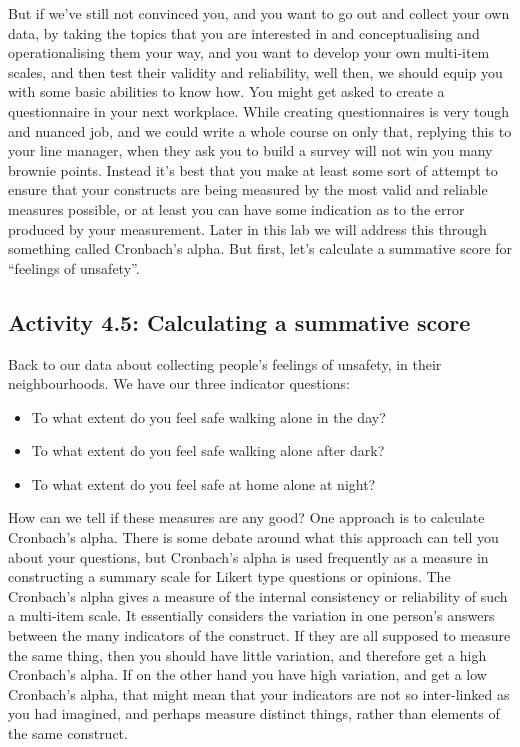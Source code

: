 \documentclass[
]{book}
\providecommand{\tightlist}{%
  \setlength{\itemsep}{0pt}\setlength{\parskip}{0pt}}
\begin{document}
But if we've still not convinced you, and you want to go out and collect your own data, by taking the topics that you are interested in and conceptualising and operationalising them your way, and you want to develop your own multi-item scales, and then test their validity and reliability, well then, we should equip you with some basic abilities to know how. You might get asked to create a questionnaire in your next workplace. While creating questionnaires is very tough and nuanced job, and we could write a whole course on only that, replying this to your line manager, when they ask you to build a survey will not win you many brownie points. Instead it's best that you make at least some sort of attempt to ensure that your constructs are being measured by the most valid and reliable measures possible, or at least you can have some indication as to the error produced by your measurement. Later in this lab we will address this through something called Cronbach's alpha. But first, let's calculate a summative score for ``feelings of unsafety''.

\hypertarget{activity-4.5-calculating-a-summative-score}{%
\subsection{Activity 4.5: Calculating a summative score}\label{activity-4.5-calculating-a-summative-score}}

Back to our data about collecting people's feelings of unsafety, in their neighbourhoods. We have our three indicator questions:

\begin{itemize}
\tightlist
\item
  To what extent do you feel safe walking alone in the day?
\item
  To what extent do you feel safe walking alone after dark?
\item
  To what extent do you feel safe at home alone at night?
\end{itemize}

How can we tell if these measures are any good? One approach is to calculate Cronbach's alpha. There is some debate around what this approach can tell you about your questions, but Cronbach's alpha is used frequently as a measure in constructing a summary scale for Likert type questions or opinions. The Cronbach's alpha gives a measure of the internal consistency or reliability of such a multi-item scale. It essentially considers the variation in one person's answers between the many indicators of the construct. If they are all supposed to measure the same thing, then you should have little variation, and therefore get a high Cronbach's alpha. If on the other hand you have high variation, and get a low Cronbach's alpha, that might mean that your indicators are not so inter-linked as you had imagined, and perhaps measure distinct things, rather than elements of the same construct.
\end{document}
